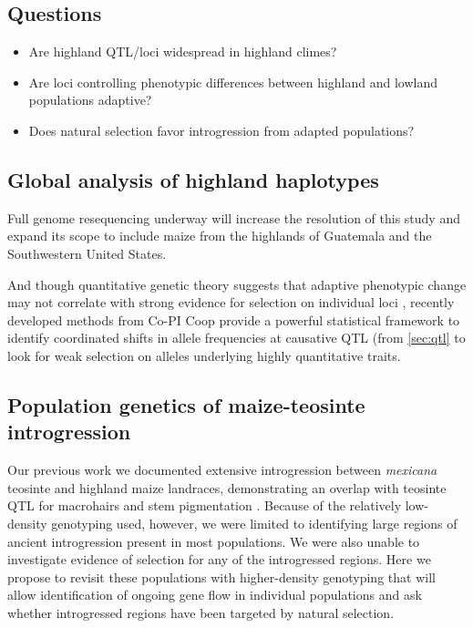 \subsection*{Questions}
\begin{itemize}[topsep=0pt,itemsep=-1ex,partopsep=1ex,parsep=1ex]
\item Are highland QTL/loci widespread in highland climes?
\item Are loci controlling phenotypic differences between highland and lowland populations adaptive?
\item Does natural selection favor introgression from adapted populations?
\end{itemize}

\subsection{Global analysis of highland haplotypes} \label{subsec:global}



Full genome resequencing underway will increase the resolution of this study and expand its scope to include maize from the highlands of Guatemala and the Southwestern United States.

And though quantitative genetic theory suggests that adaptive phenotypic change may not correlate with strong evidence for selection on individual loci \citep{le2012genetic}, recently developed methods from Co-PI Coop \citep{Berg2013} provide a powerful statistical framework to identify coordinated shifts in allele frequencies at causative QTL (from \ref{sec:qtl} to look for weak selection on alleles underlying highly quantitative traits.  

\subsection{Population genetics of maize-teosinte introgression} \label{subsec:intropopgen}

Our previous work \citep{Hufford2013} we documented extensive introgression between \emph{mexicana} teosinte and highland maize landraces, demonstrating an overlap with teosinte QTL for macrohairs and stem pigmentation \citep{Lauter2004a}. Because of the relatively low-density genotyping used, however, we were limited to identifying large regions of ancient introgression present in most populations.  We were also unable to investigate evidence of selection for any of the introgressed regions.  Here we propose to revisit these populations with higher-density genotyping that will allow identification of ongoing gene flow in individual populations and ask whether introgressed regions have been targeted by natural selection.  

